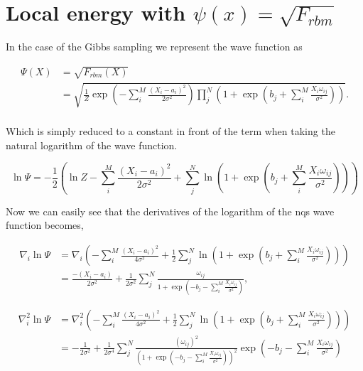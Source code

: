 \section{Local energy with $\psi(x) = \sqrt{F_{rbm}}$}

In the case of the Gibbs sampling we represent the wave function as 

\begin{align*}
\Psi(X) &= \sqrt{F_{rbm}(X)} \\
&= \sqrt{\frac{1}{Z} \exp \left( -\sum_{i}^{M} \frac{(X_i - a_i)^2}{2 \sigma^2} \right) \prod_{j}^{N} \left( 1 + \exp \left( b_j + \sum_{i}^{M} \frac{X_i \omega_{ij}}{\sigma^2} \right) \right)}.\\
\end{align*}

Which is simply reduced to a constant in front of the term when taking the natural logarithm of the wave function.

\begin{equation*}
\ln \Psi = -\frac{1}{2} \left( \ln Z - \sum_{i}^{M} \frac{(X_i - a_i)^2}{2 \sigma^2} +  \sum_{j}^{N} \ln \left(1 + \exp \left( b_j + \sum_{i}^{M} \frac{X_i \omega_{ij}}{\sigma^2} \right) \right) \right)
\end{equation*}

Now we can easily see that the derivatives of the logarithm of the nqs wave function becomes,

\begin{align*}
\nabla_i \ln \Psi &= \nabla_i \left( - \sum_{i}^{M} \frac{(X_i - a_i)^2}{4 \sigma^2} +  \frac{1}{2} \sum_{j}^{N} \ln \left( 1 + \exp \left( b_j + \sum_{i}^{M} \frac{X_i \omega_{ij}}{\sigma^2} \right) \right) \right) \\
&= \frac{-(X_i - a_i)}{2\sigma^2} + \frac{1}{2\sigma^2}\sum_{j}^{N} \frac{\omega_{ij}}{1 + \exp \left( -b_j - \sum_{i}^{M} \frac{X_i \omega_{ij}}{\sigma^2} \right)},
\end{align*}


\begin{align*}
\nabla_i^2 \ln \Psi &= \nabla_i^2 \left( - \sum_{i}^{M} \frac{(X_i - a_i)^2}{4 \sigma^2} +  \frac{1}{2} \sum_{j}^{N} \ln \left( 1 + \exp \left( b_j + \sum_{i}^{M} \frac{X_i \omega_{ij}}{\sigma^2} \right) \right) \right) \\
&= -\frac{1}{2\sigma^2} + \frac{1}{2\sigma^4} \sum_{j}^{N} \frac{\left(\omega_{ij}\right)^2  }{\left(1 + \exp \left( -b_j - \sum_{i}^{M} \frac{X_i \omega_{ij}}{\sigma^2} \right)\right)^2}\exp \left( -b_j - \sum_{i}^{M} \frac{X_i \omega_{ij}}{\sigma^2} \right) 
\end{align*}

